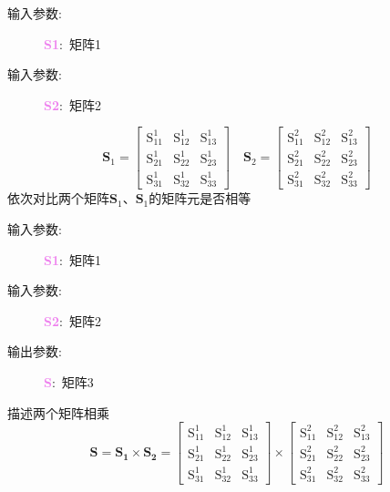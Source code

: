 \documentclass{article}      %
\begin{document}
\vskip 30pt
\begin{description}
	\item[输入参数:~]\textcolor{violet}{\textbf{S1}}:~矩阵1
	\item[输入参数:~]\textcolor{violet}{\textbf{S2}}:~矩阵2
\end{description}
\begin{displaymath}\mathbf{S}_1=
	\begin{bmatrix}
		\mathrm{S}_{11}^1 &\mathrm{S}_{12}^1 &\mathrm{S}_{13}^1\\
		\mathrm{S}_{21}^1 &\mathrm{S}_{22}^1 &\mathrm{S}_{23}^1\\
		\mathrm{S}_{31}^1 &\mathrm{S}_{32}^1 &\mathrm{S}_{33}^1
	\end{bmatrix}\quad\mathbf{S}_2=
	\begin{bmatrix}
		\mathrm{S}_{11}^2 &\mathrm{S}_{12}^2 &\mathrm{S}_{13}^2\\
		\mathrm{S}_{21}^2 &\mathrm{S}_{22}^2 &\mathrm{S}_{23}^2\\
		\mathrm{S}_{31}^2 &\mathrm{S}_{32}^2 &\mathrm{S}_{33}^2
	\end{bmatrix}
\end{displaymath}
依次对比两个矩阵$\mathbf{S}_1$、$\mathbf{S}_1$的矩阵元是否相等

\vskip 30pt
\begin{description}
	\item[输入参数:~]\textcolor{violet}{\textbf{S1}}:~矩阵1
	\item[输入参数:~]\textcolor{violet}{\textbf{S2}}:~矩阵2
	\item[输出参数:~]\textcolor{violet}{\textbf{S}}:~矩阵3
\end{description}
描述两个矩阵相乘
\begin{displaymath}\mathbf{S}=\mathbf{S_1}\times\mathbf{S_2}=
	\begin{bmatrix}
		\mathrm{S}_{11}^1 &\mathrm{S}_{12}^1 &\mathrm{S}_{13}^1\\
		\mathrm{S}_{21}^1 &\mathrm{S}_{22}^1 &\mathrm{S}_{23}^1\\
		\mathrm{S}_{31}^1 &\mathrm{S}_{32}^1 &\mathrm{S}_{33}^1
	\end{bmatrix}\times
	\begin{bmatrix}
		\mathrm{S}_{11}^2 &\mathrm{S}_{12}^2 &\mathrm{S}_{13}^2\\
		\mathrm{S}_{21}^2 &\mathrm{S}_{22}^2 &\mathrm{S}_{23}^2\\
		\mathrm{S}_{31}^2 &\mathrm{S}_{32}^2 &\mathrm{S}_{33}^2
	\end{bmatrix}
\end{displaymath}
\end{document}
